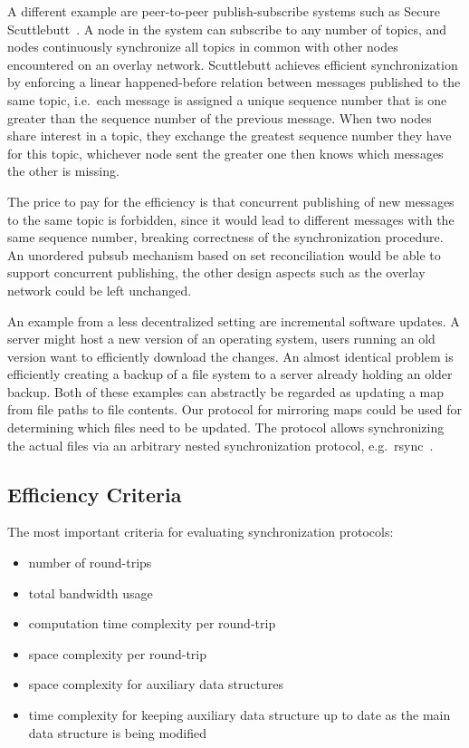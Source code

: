 \documentclass{article}
\begin{document}
A different example are peer-to-peer publish-subscribe systems such as
Secure Scuttlebutt~\cite{tarr2019secure}. A node in the system can subscribe to
any number of topics, and nodes continuously synchronize all topics in
common with other nodes encountered on an overlay network. Scuttlebutt achieves
efficient synchronization by enforcing a linear happened-before
relation between messages published to the same topic, i.e.~each message
is assigned a unique sequence number that is one greater than the
sequence number of the previous message. When two nodes share interest
in a topic, they exchange the greatest sequence number they have for
this topic, whichever node sent the greater one then knows which
messages the other is missing.

The price to pay for the efficiency is that concurrent publishing of new
messages to the same topic is forbidden, since it would lead to
different messages with the same sequence number, breaking correctness
of the synchronization procedure. An unordered pubsub mechanism based on
set reconciliation would be able to support concurrent publishing, the
other design aspects such as the overlay network could be left
unchanged.

An example from a less decentralized setting are incremental software
updates. A server might host a new version of an operating system, users
running an old version want to efficiently download the changes. An
almost identical problem is efficiently creating a backup of a file
system to a server already holding an older backup. Both of these
examples can abstractly be regarded as updating a map from file paths to
file contents. Our protocol for mirroring maps could be used for
determining which files need to be updated. The protocol allows
synchronizing the actual files via an arbitrary nested synchronization
protocol, e.g.~rsync~\cite{tridgell1996rsync}.

\subsection{Efficiency Criteria}\label{efficiency-criteria}

The most important criteria for evaluating synchronization protocols:

\begin{itemize}
\item number of round-trips
\item total bandwidth usage
\item computation time complexity per round-trip
\item space complexity per round-trip
\item space complexity for auxiliary data structures
\item time complexity for keeping auxiliary data structure up to date as the main data structure is being modified
\end{itemize}
\end{document}
